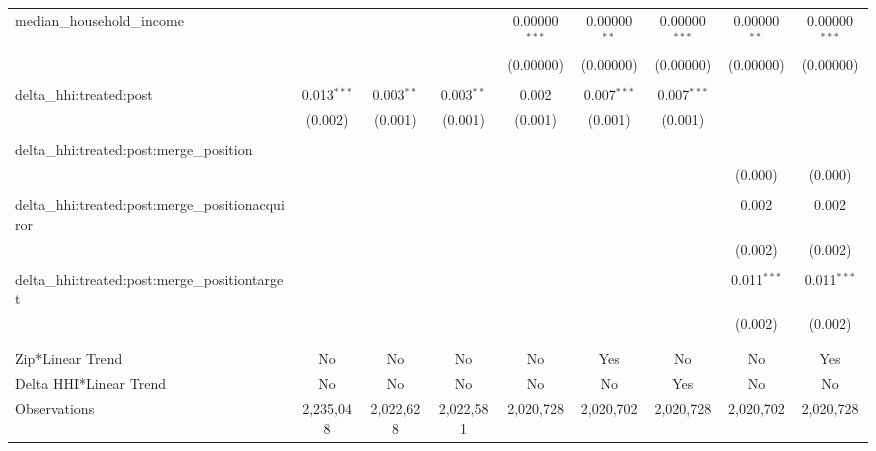 \begin{table}[H]
{\begin{tabular}{@{\extracolsep{5pt}}lcccccccc}
  median\_household\_income &  &  &  & 0.00000$^{***}$ & 0.00000$^{**}$ & 0.00000$^{***}$ & 0.00000$^{**}$ & 0.00000$^{***}$ \\  

   &  &  &  & (0.00000) & (0.00000) & (0.00000) & (0.00000) & (0.00000) \\  

   & & & & & & & & \\  

  delta\_hhi:treated:post & 0.013$^{***}$ & 0.003$^{**}$ & 0.003$^{**}$ & 0.002 & 0.007$^{***}$ & 0.007$^{***}$ &  &  \\  

   & (0.002) & (0.001) & (0.001) & (0.001) & (0.001) & (0.001) &  &  \\  

   & & & & & & & & \\  

  delta\_hhi:treated:post:merge\_position &  &  &  &  &  &  &  &  \\  

   &  &  &  &  &  &  & (0.000) & (0.000) \\  

   & & & & & & & & \\  

  delta\_hhi:treated:post:merge\_positionacquiror &  &  &  &  &  &  & 0.002 & 0.002 \\  

   &  &  &  &  &  &  & (0.002) & (0.002) \\  

   & & & & & & & & \\  

  delta\_hhi:treated:post:merge\_positiontarget &  &  &  &  &  &  & 0.011$^{***}$ & 0.011$^{***}$ \\  

   &  &  &  &  &  &  & (0.002) & (0.002) \\  

   & & & & & & & & \\  

 \hline \\[-1.8ex]  

 Zip*Linear Trend & No & No & No & No & Yes & No & No & Yes \\  

 Delta HHI*Linear Trend & No & No & No & No & No & Yes & No & No \\  

 Observations & 2,235,048 & 2,022,628 & 2,022,581 & 2,020,728 & 2,020,702 & 2,020,728 & 2,020,702 & 2,020,728 \\  


\end{tabular}}
\end{table}
